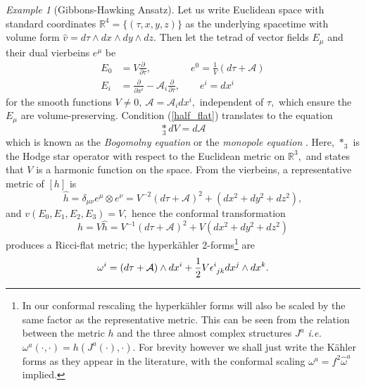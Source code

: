 \documentclass[a4paper,12pt, onecolumn, notitlepage]{article}
\theoremstyle{definition}
\theoremstyle{remark}
\newtheorem{ex}[thm]{Example}
\newcommand{\ie}{\emph{i.e.} }
\newcommand{\w}{\omega}
\newcommand{\m}{\mu}
\newcommand{\n}{\nu}
\newcommand{\e}{\epsilon}
\newcommand{\ddt}[1]{\frac{\partial #1}{\partial \tau}}
\newcommand{\dd}[2]{\frac{\partial #1}{\partial #2}}
\newcommand{\K}{K\"ahler }
\newcommand{\HK}{hyperk\"ahler }
\newcommand{\x}[1]{x^{#1}}
\newcommand{\R}{\mathbb{R}}
\begin{document}
\begin{ex}[Gibbons-Hawking Ansatz]
	Let us write Euclidean space with standard coordinates $\R^{4} = \{(\tau,x,y,z)\}$ as the underlying spacetime with volume form $\hat{v}=d\tau\wedge dx\wedge dy\wedge dz.$ Then let the tetrad of vector fields $E_{\m}$ and their dual vierbeins $e^{\m}$ be
	\begin{align*}
	\label{gh_vectors}
		E_{0} &= V\dd{}{\tau},\qquad\qquad e^{0} = \frac{1}{V}(d\tau+\mathcal{A})\\
		E_{i} &= \dd{}{\x{i}} - \mathcal{A}_{i}\ddt{},\qquad e^{i} = dx^{i}
	\end{align*}
	for the smooth functions $V\neq0,\ \mathcal{A} = \mathcal{A}_{i}dx^{i},$ independent of $\tau,$ which  ensure the $E_{\m}$ are volume-preserving. Condition (\ref{half_flat}) translates to the equation
	\begin{equation}
	\label{monopole}
		\underset{3}\ast dV = d\mathcal{A}
	\end{equation}
	which is known as the 
	\emph{Bogomolny equation} or the \emph{monopole equation} \cite{solitons}. Here, $\ast_{3}$ is the Hodge star operator with respect to the Euclidean metric on $\R^{3},$ and states that $V$ is a harmonic function on the space. From the vierbeins, a representative metric of $[h]$ is
	\begin{equation*}
		\hat{h}=\delta_{\m\n}e^{\m}\otimes e^{\n} = V^{-2}(d\tau + \mathcal{A})^{2} + (dx^{2} + dy^{2} + dz^{2}),
	\end{equation*}
	and $v(E_{0},E_{1},E_{2},E_{3})=V,$ hence the conformal transformation
	\begin{equation}
		\label{gh_metric}
		h = V\hat{h} =  V^{-1}(d\tau + \mathcal{A})^{2} + V(dx^{2} + dy^{2} + dz^{2})
	\end{equation}
	produces a Ricci-flat metric; 
	the \HK 2-forms\footnote{In our conformal rescaling the \HK forms will also be scaled by the same factor as the representative metric. This can be seen from the relation between the metric $h$ and the three almost complex structures $J^{a}$ \ie $\w^{a}(\cdot,\cdot) = h(J^{a}(\cdot),\cdot).$ For brevity however we shall just write the \K forms as they appear in the literature, with the conformal scaling $\w^{a} = f^{2}\hat{\w}^{a}$ implied.} are
	\begin{equation}
	\label{gh_forms}
		\w\indices{^i} = (d\tau + \mathcal{A})\wedge dx\indices{^i} + \frac{1}{2}V\e\indices{^i_j_k}dx\indices{^j}\wedge dx\indices{^k}.
	\end{equation}

\end{ex}
\end{document}
